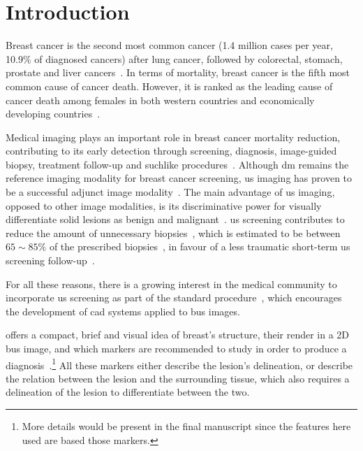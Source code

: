 \graphicspath{ {./content/intro/figures/} }

\section{Introduction}
\label{sec:intro}  %


Breast cancer is the second most common cancer (1.4 million cases per year, 10.9\% of  diagnosed cancers) after lung cancer, followed by colorectal, stomach, prostate and liver cancers~\cite{Ferlay2010}.
In terms of mortality, breast cancer is the fifth most common cause of cancer death.
However, it is ranked as the leading cause of cancer death among females in both western countries and economically developing countries~\cite{cancerStatistics2011}.

Medical imaging plays an important role in breast cancer mortality reduction, contributing to its early detection through screening, diagnosis, image-guided biopsy, treatment follow-up and suchlike procedures~\cite{smith2003american}.
Although \ac{dm} remains the reference imaging modality for breast cancer screening, \ac{us} imaging has proven to be a successful adjunct image modality~\cite{smith2003american,berg2004diagnostic}.
The main advantage of \ac{us} imaging, opposed to other image modalities, is its discriminative power for visually differentiate solid lesions as benign and malignant~\cite{Stavros:1995p12392}.
\Ac{us} screening contributes to reduce the amount of unnecessary biopsies~\cite{ciatto1994contribution}, which is estimated to be between $65\sim85\%$ of the prescribed biopsies~\cite{yuan2010multimodality}, in favour of a less traumatic short-term \ac{us} screening follow-up~\cite{gordon1995malignant}.

For all these reasons, there is a growing interest in the medical community to incorporate \ac{us} screening as part of the standard procedure~\cite{biradsus}, which encourages the development of \ac{cad} systems applied to \ac{bus} images.

 offers a compact, brief and visual idea of breast's structure, their render in a 2D \ac{bus} image, and which markers are recommended to study in order to produce a diagnosis~\cite{biradsus}.\footnote{More details would be present in the final manuscript since the features here used are based those markers.}
All these markers either describe the lesion's delineation, or describe the relation between the lesion and the surrounding tissue, which also requires a delineation of the lesion to differentiate between the two.

